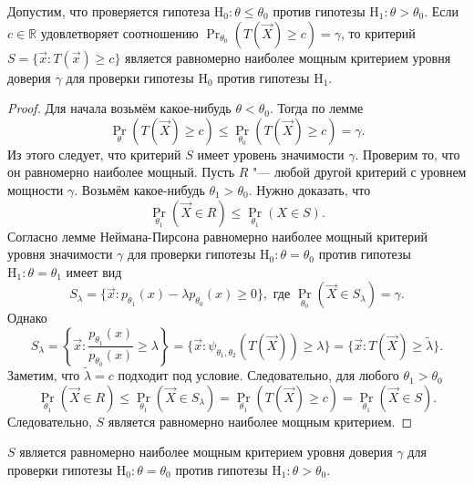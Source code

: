 \begin{theorem}
	Допустим, что проверяется гипотеза $\mathrm{H}_{0} \colon \theta \leq \theta_{0}$ против гипотезы $\mathrm{H}_{1} \colon \theta > \theta_{0}$. Если $c \in \mathbb{R}$ удовлетворяет соотношению $\Pr_{\theta_{0}}(T(\vec{X}) \geq c) = \gamma$, то критерий $S = \{\vec{x} \colon T(\vec{x}) \geq c\}$ является равномерно наиболее мощным критерием уровня доверия $\gamma$ для проверки гипотезы $\mathrm{H}_{0}$ против гипотезы $\mathrm{H}_{1}$.
\end{theorem}
\begin{proof}
	Для начала возьмём какое-нибудь $\theta < \theta_{0}$. Тогда по лемме
	\begin{equation}
		\Pr_{\theta}(T(\vec{X}) \geq c) \leq \Pr_{\theta_{0}}(T(\vec{X}) \geq c) = \gamma.
	\end{equation}
	Из этого следует, что критерий $S$ имеет уровень значимости $\gamma$. Проверим то, что он равномерно наиболее мощный. Пусть $R$ "--- любой другой критерий с уровнем мощности $\gamma$. Возьмём какое-нибудь $\theta_{1} > \theta_{0}$. Нужно доказать, что
	\begin{equation}
		\Pr_{\theta_{1}}(\vec{X} \in R) \leq \Pr_{\theta_{1}}(X \in S).
	\end{equation}
	Согласно лемме Неймана-Пирсона равномерно наиболее мощный критерий уровня значимости $\gamma$ для проверки гипотезы $\mathrm{H}_{0} \colon \theta = \theta_{0}$ против гипотезы $\mathrm{H}_{1} \colon \theta = \theta_{1}$ имеет вид
	\begin{equation}
		S_{\lambda} = \{\vec{x} \colon p_{\theta_{1}}(x) - \lambda p_{\theta_{0}}(x) \geq 0\}, \text{ где } \Pr_{\theta_{0}}(\vec{X} \in S_{\lambda}) = \gamma.
	\end{equation}
	Однако
	\begin{equation}
		S_{\lambda} 
		= \left\{\vec{x} \colon \frac{p_{\theta_{1}}(x)}{p_{\theta_{0}}(x)} \geq \lambda\right\}
		= \{\vec{x} \colon \psi_{\theta_{1}, \theta_{2}}(T(\vec{X})) \geq \lambda\}
		= \{\vec{x} \colon T(\vec{X}) \geq \tilde{\lambda}\}.
	\end{equation}
	Заметим, что $\tilde{\lambda} = c$ подходит под условие. Следовательно, для любого $\theta_{1} > \theta_{0}$
	\begin{equation}
		\Pr_{\theta_{1}}(\vec{X} \in R) 
		\leq \Pr_{\theta_{1}}(\vec{X} \in S_{\lambda})
		= \Pr_{\theta_{1}}(T(\vec{X}) \geq c)
		= \Pr_{\theta_{1}}(\vec{X} \in S).
	\end{equation}
	Следовательно, $S$ является равномерно наиболее мощным критерием.
\end{proof}
\begin{consequence}
	$S$ является равномерно наиболее мощным критерием уровня доверия $\gamma$ для проверки гипотезы $\mathrm{H}_{0} \colon \theta = \theta_{0}$ против гипотезы $\mathrm{H}_{1} \colon \theta > \theta_{0}$.
\end{consequence}

